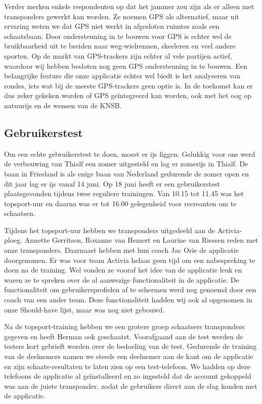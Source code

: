 Verder merken enkele respondenten op dat het jammer zou zijn als er alleen met transponders gewerkt kan worden. Ze noemen GPS als alternatief, maar uit ervaring weten we dat GPS niet werkt in afgesloten ruimtes zoals een schaatsbaan. Door ondersteuning in te bouwen voor GPS is echter wel de bruikbaarheid uit te breiden naar weg-wielrennen, skeeleren en veel andere sporten. Op de markt van GPS-trackers zijn echter al vele partijen actief, waardoor wij hebben besloten nog geen GPS ondersteuning in te bouwen. Een belangrijke feature die onze applicatie echter wel biedt is het analyseren van rondes, iets wat bij de meeste GPS-trackers geen optie is. In de toekomst kan er dus zeker gekeken worden of GPS geïntegreerd kan worden, ook met het oog op natuurijs en de wensen van de \ac{KNSB}.

\subsection{Gebruikerstest}
Om een echte gebruikerstest te doen, moest er ijs liggen. Gelukkig voor ons werd de verbouwing van Thialf een zomer uitgesteld en lag er zomerijs in Thialf. De baan in Friesland is als enige baan van Nederland gedurende de zomer open en dit jaar lag er ijs vanaf 14 juni. Op 18 juni heeft er een gebruikerstest plaatsgevonden tijdens twee reguliere trainingen. Van 10.15 tot 11.45 was het topsport-uur en daarna was er tot 16.00 gelegenheid voor recreanten om te schaatsen.

Tijdens het topsport-uur hebben we transponders uitgedeeld aan de Activia-ploeg. Annette Gerritsen, Roxanne van Hemert en Laurine van Riessen reden met onze transponders. Daarnaast hebben met hun coach Jac Orie de applicatie doorgenomen. Er was voor team Activia helaas geen tijd om een nabespreking te doen na de training. Wel vonden ze vooraf het idee van de applicatie leuk en waren ze te spreken over de al aanwezige functionaliteit in de applicatie. De functionaliteit om gebruikersprofielen af te schermen werd nog genoemd door een coach van een ander team. Deze functionaliteit hadden wij ook al opgenomen in onze Should-have lijst, maar was nog niet gebouwd.

Na de topsport-training hebben we een grotere groep schaatsers transponders gegeven en heeft Herman ook geschaatst. Voorafgaand aan de test werden de testers kort gebrieft worden over de bedoeling van de test. Gedurende de training van de deelnemers namen we steeds een deelnemer aan de kant om de applicatie en zijn schaats-resultaten te laten zien op een test-telefoon. We hadden op deze telefoons de applicatie al geïnstalleerd en zo ingesteld dat de account gekoppeld was aan de juiste transponder, zodat de gebruikers direct aan de slag konden met de applicatie.

